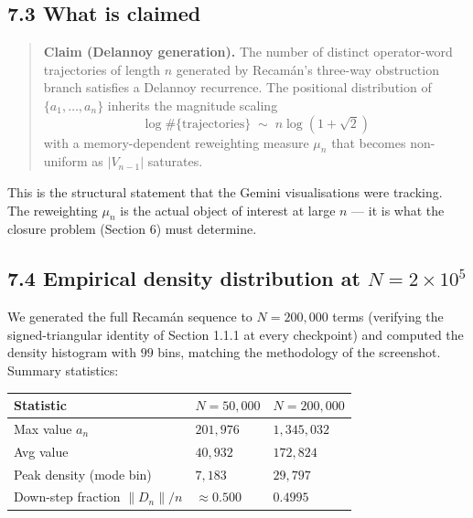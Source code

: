 \documentclass[
  11pt,
]{article}
\begin{document}
\hypertarget{what-is-claimed}{%
\subsection{7.3 What is claimed}\label{what-is-claimed}}

\begin{quote}
\textbf{Claim (Delannoy generation).} The number of distinct
operator-word trajectories of length \(n\) generated by Recamán's
three-way obstruction branch satisfies a Delannoy recurrence. The
positional distribution of \(\{a_1, \dots, a_n\}\) inherits the
magnitude scaling \[
\log \#\{\text{trajectories}\} \;\sim\; n \log(1 + \sqrt{2})
\] with a memory-dependent reweighting measure \(\mu_n\) that becomes
non-uniform as \(|V_{n-1}|\) saturates.
\end{quote}

This is the structural statement that the Gemini visualisations were
tracking. The reweighting \(\mu_n\) is the actual object of interest at
large \(n\) --- it is what the closure problem (Section 6) must
determine.

\hypertarget{empirical-density-distribution-at-n-2-times-105}{%
\subsection{\texorpdfstring{7.4 Empirical density distribution at
\(N = 2 \times 10^5\)}{7.4 Empirical density distribution at N = 2 \textbackslash times 10\^{}5}}\label{empirical-density-distribution-at-n-2-times-105}}

We generated the full Recamán sequence to \(N = 200{,}000\) terms
(verifying the signed-triangular identity of Section 1.1.1 at every
checkpoint) and computed the density histogram with \(99\) bins,
matching the methodology of the screenshot. Summary statistics:

\begin{longtable}[]{@{}lll@{}}
\toprule\noalign{}
Statistic & \(N = 50{,}000\) & \(N = 200{,}000\) \\
\midrule\noalign{}
\endhead
\bottomrule\noalign{}
\endlastfoot
Max value \(a_n\) & \(201{,}976\) & \(1{,}345{,}032\) \\
Avg value & \(40{,}932\) & \(172{,}824\) \\
Peak density (mode bin) & \(7{,}183\) & \(29{,}797\) \\
Down-step fraction \(\|D_n\|/n\) & \(\approx 0.500\) & \(0.4995\) \\
\end{longtable}
\end{document}
